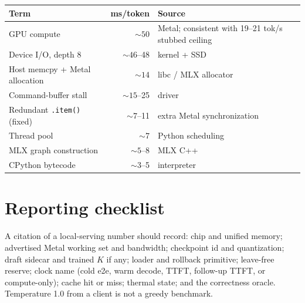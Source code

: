 \documentclass[11pt]{article}
\theoremstyle{definition}
\begin{document}
\begin{center}
\small
\begin{tabular}{@{}lrl@{}}
\toprule
Term & ms/token & Source \\
\midrule
GPU compute & ${\sim}50$ & Metal; consistent with 19--21 tok/s stubbed ceiling \\
Device I/O, depth 8 & ${\sim}46$--48 & kernel + SSD \\
Host memcpy + Metal allocation & ${\sim}14$ & libc / MLX allocator \\
Command-buffer stall & ${\sim}15$--25 & driver \\
Redundant \texttt{.item()} (fixed) & ${\sim}7$--11 & extra Metal synchronization \\
Thread pool & ${\sim}7$ & Python scheduling \\
MLX graph construction & ${\sim}5$--8 & MLX C++ \\
CPython bytecode & ${\sim}3$--5 & interpreter \\
\bottomrule
\end{tabular}
\end{center}

\section{Reporting checklist}
\label{app:checklist}

A citation of a local-serving number should record: chip and unified memory; advertised Metal working set and bandwidth; checkpoint id and quantization; draft sidecar and trained $K$ if any; loader and rollback primitive; leave-free reserve; clock name (cold e2e, warm decode, TTFT, follow-up TTFT, or compute-only); cache hit or miss; thermal state; and the correctness oracle. Temperature 1.0 from a client is not a greedy benchmark.
\end{document}

